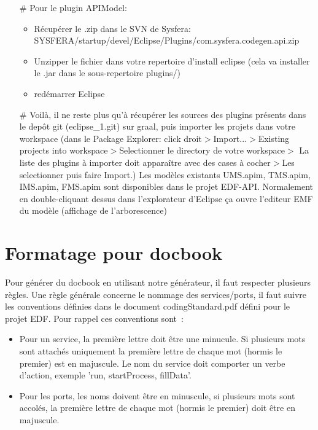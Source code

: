 \documentclass{article}
\begin{document}
\begin{itemize}
\begin{itemize}
  \item[\#] Pour le plugin APIModel:
    \begin{itemize}
      \item R\'ecup\'erer le .zip dans le SVN de Sysfera: SYSFERA/startup/devel/Eclipse\-/Plugins/com.sysfera.codegen.api.zip
      \item Unzipper le fichier dans votre repertoire d'install eclipse (cela va installer le .jar dans le sous-repertoire plugins/)
      \item red\'emarrer Eclipse
    \end{itemize}
  \item[\#] Voil\`a, il ne reste plus qu'\`a r\'ecup\'erer les sources des plugins présents dans le depôt git (eclipse\_1.git) sur graal, puis importer les projets dans votre workspace (dans le Package Explorer: click droit$>$Import...$>$Existing projects into workspace$>$Selectionner le directory de votre workspace$>$ La liste des plugins \`a importer doit appara\^itre avec des cases à cocher$>$Les selectionner puis faire Import.) Les mod\`eles existants UMS.apim, TMS.apim, IMS.apim, FMS.apim sont disponibles dans le projet EDF-API. Normalement en double-cliquant dessus dans l'explorateur d'Eclipse ça ouvre l'editeur EMF du modèle (affichage de l'arborescence)
  \end{itemize}
\end{itemize}

\section*{Formatage pour docbook}
Pour g\'en\'erer du docbook en utilisant notre g\'en\'erateur, il faut respecter plusieurs r\`egles. 
Une r\`egle g\'en\'erale concerne le nommage des services/ports, il faut suivre les conventions d\'efinies dans le document codingStandard.pdf d\'efini pour le projet EDF. Pour rappel ces conventions sont~:
\begin{itemize}
\item Pour un service, la premi\`ere lettre doit \^etre une minucule. Si plusieurs mots sont attach\'es uniquement la premi\`ere lettre de chaque mot (hormis le premier) est en majuscule. Le nom du service doit comporter un verbe d'action, exemple 'run, startProcess, fillData'.
\item Pour les ports, les noms doivent \^etre en minuscule, si plusieurs mots sont accol\'es, la premi\`ere lettre de chaque mot (hormis le premier) doit \^etre en majuscule.
\end{itemize}
\end{document}
